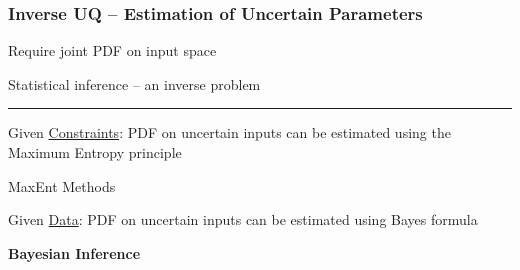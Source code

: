 \begin{frame}[t]
\label{bayes_motiv}

\frametitle{Inverse UQ -- Estimation of Uncertain Parameters}


\bi
\item Require joint PDF on input space
\item Statistical inference -- an inverse problem
\ei

\bigskip
\hrule
\bigskip

\bi
\item Given \underline{Constraints}: PDF on uncertain inputs can be estimated using the Maximum Entropy principle
\bdi \item MaxEnt Methods \edi
\medskip
\medskip
\item Given \underline{Data}: PDF on uncertain inputs can be estimated using Bayes formula
\bdi \item \textbf{Bayesian Inference} \edi
\ei

\end{frame}
